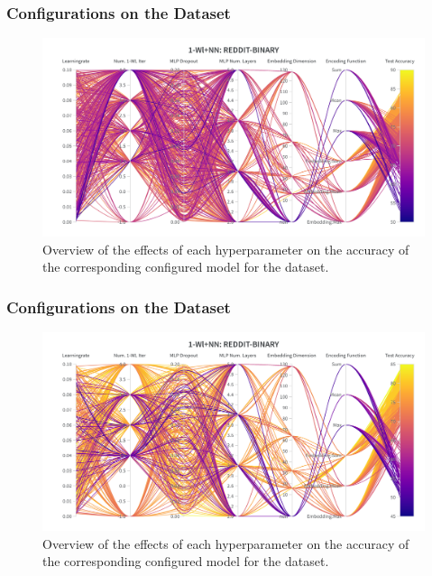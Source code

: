 \subsubsection{\wlnn Configurations on the \mutag Dataset}
\begin{figure}[H]
    \centering
    \includegraphics[width=\textwidth, trim={0 75 0 150}, clip]{Figures/hyperparameter_wlnn_mutag.png}
    \caption{Overview of the effects of each hyperparameter on the accuracy of the corresponding configured \wlnn model for the \mutag dataset.}
\end{figure}

\subsubsection{\wlnn Configurations on the \nci Dataset}
\begin{figure}[H]
    \centering
    \includegraphics[width=\textwidth, trim={0 75 0 150}, clip]{Figures/hyperparameter_wlnn_nci1.png}
    \caption{Overview of the effects of each hyperparameter on the accuracy of the corresponding configured \wlnn model for the \nci dataset.}
\end{figure}
\clearpage

